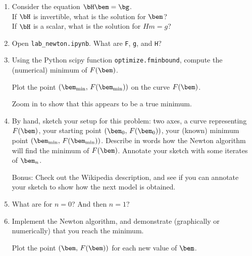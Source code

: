 \documentclass[11pt,titlepage,fleqn]{article}
\renewcommand{\vertgap}{\vspace{1.5cm}}
\newcommand{\tfile}{{\tt lab\_newton.ipynb}}
\begin{document}
\begin{enumerate}
\item Consider the equation $\bH\bem = \bg$. \\
If $\bH$ is invertible, what is the solution for $\bem$? \\
If $\bH$ is a scalar, what is the solution for $Hm = g$?


\vertgap

\item Open \tfile. What are \verb+F+, \verb+g+, and \verb+H+?

\vertgap

\item Using the Python scipy function \verb+optimize.fminbound+, compute the (numerical) minimum of $F(\bem)$.

Plot the point $(\bem_{\rm min},\,F(\bem_{\rm min}))$ on the curve $F(\bem)$.

Zoom in to show that this appears to be a true minimum.

\item By hand, sketch your setup for this problem: two axes, a curve representing $F(\bem)$, your starting point $(\bem_0,\,F(\bem_0))$, your (known) minimum point $(\bem_{\rm min},\,F(\bem_{\rm min}))$. Describe in words how the Newton algorithm will find the minimum of $F(\bem)$. Annotate your sketch with some iterates of $\bem_n$.

Bonus: Check out the Wikipedia description, and see if you can annotate your sketch to show how the next model is obtained.

\vspace{10cm}

\item What are  for $n=0$? And then $n=1$?

\vertgap
\vertgap

\item Implement the Newton algorithm, and demonstrate (graphically or numerically) that you reach the minimum.

Plot the point $(\bem,\,F(\bem))$ for each new value of $\bem$.


\end{enumerate}
\end{document}
